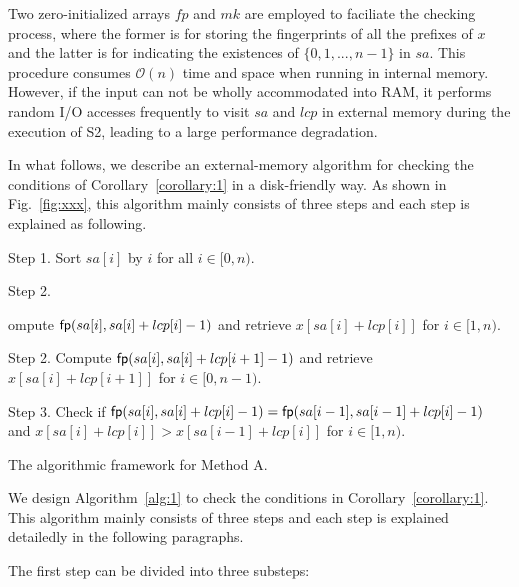 \documentclass[10pt,journal,compsoc]{IEEEtran}
\begin{document}
Two zero-initialized arrays $fp$ and $mk$ are employed to faciliate the checking process, where the former is for storing the fingerprints of all the prefixes of $x$ and the latter is for indicating the existences of $\{0, 1, ..., n - 1\}$ in $sa$. This procedure consumes $\mathcal{O}(n)$ time and space when running in internal memory. However, if the input can not be wholly accommodated into RAM, it performs random I/O accesses frequently to visit $sa$ and $lcp$ in external memory during the execution of S2, leading to a large performance degradation. 

In what follows, we describe an external-memory algorithm for checking the conditions of Corollary~\ref{corollary:1} in a disk-friendly way. As shown in Fig.~\ref{fig:xxx}, this algorithm mainly consists of three steps and each step is explained as following.

\begin{algorithm*}
	
	\SetAlgoNoLine
	
	
	Step 1. Sort $sa[i]$ by $i$ for all $i \in [0, n)$. 
	
	Step 2.  
	
	ompute ${\sf fp}(sa[i], sa[i] + lcp[i] - 1)$ and retrieve $x[sa[i] + lcp[i]]$ for $i \in [1, n)$.
	
	Step 2. Compute ${\sf fp}(sa[i], sa[i] + lcp[i + 1] - 1)$ and retrieve $x[sa[i] + lcp[i + 1]]$ for $i \in [0, n - 1)$.
	
	Step 3. Check if ${\sf fp}(sa[i], sa[i] + lcp[i] - 1) = {\sf fp}(sa[i - 1], sa[i - 1] + lcp[i] - 1)$ and $x[sa[i] + lcp[i]] > x[sa[i - 1] + lcp[i]]$ for $i \in [1, n)$.
	
	\caption{The algorithmic framework for Method A.}
	
	\label{alg:1}
	
\end{algorithm*}
	
	We design Algorithm~\ref{alg:1} to check the conditions in Corollary~\ref{corollary:1}. This algorithm mainly consists of three steps and each step is explained detailedly in the following paragraphs.
	
	\vspace{1ex}  The first step can be divided into three substeps:
	
\end{document}
